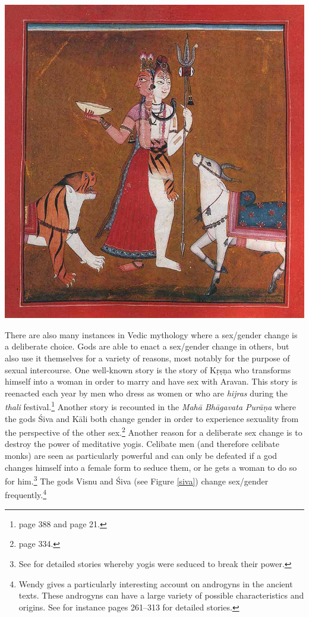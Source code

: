 \bigskip
\includegraphics[width=\textwidth]{androgyne.jpg}
\begin{minipage}{\textwidth}
\label{siva}
\end{minipage}
\medskip

There are also many instances in Vedic mythology where a sex/gender change is a deliberate choice. Gods are able to enact a sex/gender change in others, but also use it themselves for a variety of reasons, most notably for the purpose of sexual intercourse. One well-known story is the story of Kṛṣṇa who transforms himself into a woman in order to marry and have sex with Aravan. This story is reenacted each year by men who dress as women or who are {\em hijras} during the {\em thali} festival.\footnote{\cite{goldman} page 388 and \cite{nanda} page 21.} Another story is recounted in the {\em Mahā Bhāgavata Purāṇa} where the gods Śiva and Kāli both change gender in order to experience sexuality from the perspective of the other sex.\footnote{\cite{wendy} page 334.} Another reason for a deliberate sex change is to destroy the power of meditative yogis. Celibate men (and therefore celibate monks) are seen as particularly powerful and can only be defeated if a god changes himself into a female form to seduce them, or he gets a woman to do so for him.\footnote{See \cite{wendy1969} for detailed stories whereby yogis were seduced to break their power.} The gods Visnu and Śiva (see Figure \ref{siva}) change sex/gender frequently.\footnote{Wendy \cite{wendy} gives a particularly interesting account on androgyns in the ancient texts. These androgyns can have a large variety of possible characteristics and origins. See for instance pages 261–313 for detailed stories.}

